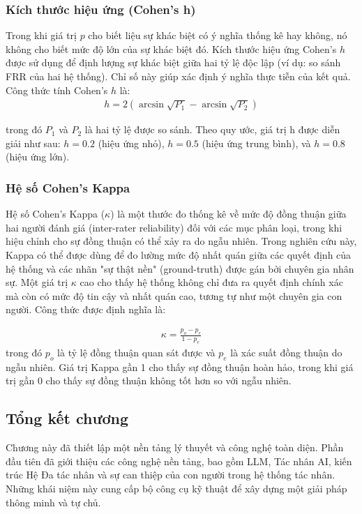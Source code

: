 \documentclass{article}
\begin{document}
\subsubsection{Kích thước hiệu ứng (Cohen's h)}
Trong khi giá trị $p$ cho biết liệu sự khác biệt có ý nghĩa thống kê hay không, nó không cho biết mức độ lớn của sự khác biệt đó. Kích thước hiệu ứng Cohen's $h$ được sử dụng để định lượng sự khác biệt giữa hai tỷ lệ độc lập (ví dụ: so sánh FRR của hai hệ thống). Chỉ số này giúp xác định ý nghĩa thực tiễn của kết quả. Công thức tính Cohen's $h$ là:
\begin{gather*}
h = 2(\arcsin\sqrt{P_1} -\arcsin\sqrt{P_2})
\end{gather*}

trong đó $P_1$ và $P_2$ là hai tỷ lệ được so sánh. Theo quy ước, giá trị h được diễn giải như sau: $h=0.2$ (hiệu ứng nhỏ), $h=0.5$ (hiệu ứng trung bình), và $h=0.8$ (hiệu ứng lớn).

\subsubsection{Hệ số Cohen's Kappa}
Hệ số Cohen's Kappa ($\kappa$) là một thước đo thống kê về mức độ đồng thuận giữa hai người đánh giá (inter-rater reliability) đối với các mục phân loại, trong khi hiệu chỉnh cho sự đồng thuận có thể xảy ra do ngẫu nhiên. Trong nghiên cứu này, Kappa có thể được dùng để đo lường mức độ nhất quán giữa các quyết định của hệ thống và các nhãn "sự thật nền" (ground-truth) được gán bởi chuyên gia nhân sự. Một giá trị $\kappa$ cao cho thấy hệ thống không chỉ đưa ra quyết định chính xác mà còn có mức độ tin cậy và nhất quán cao, tương tự như một chuyên gia con người. Công thức được định nghĩa là:

\begin{gather*}
\kappa = \frac{p_o-p_e}{1-p_e}
\end{gather*}
trong đó $p_o$ là tỷ lệ đồng thuận quan sát được và $p_e$ là xác suất đồng thuận do ngẫu nhiên. Giá trị Kappa gần 1 cho thấy sự đồng thuận hoàn hảo, trong khi giá trị gần 0 cho thấy sự đồng thuận không tốt hơn so với ngẫu nhiên.

\subsection{Tổng kết chương}
Chương này đã thiết lập một nền tảng lý thuyết và công nghệ toàn diện. Phần đầu tiên đã giới thiệu các công nghệ nền tảng, bao gồm LLM, Tác nhân AI, kiến trúc Hệ Đa tác nhân và sự can thiệp của con người trong hệ thống tác nhân. Những khái niệm này cung cấp bộ công cụ kỹ thuật để xây dựng một giải pháp thông minh và tự chủ.
\end{document}
